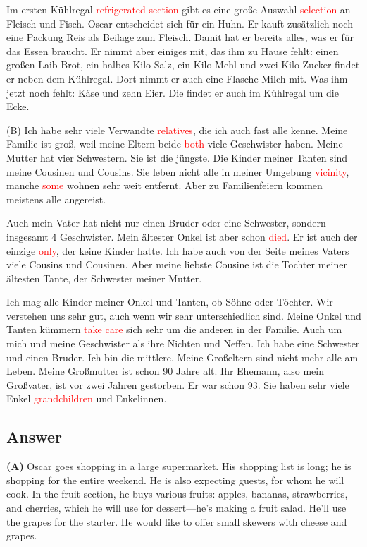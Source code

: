 \documentclass[a4paper,12pt]{article}
\begin{document}
Im ersten Kühlregal \textcolor{red}{refrigerated section} gibt es eine große Auswahl \textcolor{red}{selection} an Fleisch und Fisch. Oscar entscheidet sich für ein Huhn. Er kauft zusätzlich noch eine Packung Reis als Beilage zum Fleisch. Damit hat er bereits alles, was er für das Essen braucht. Er nimmt aber einiges mit, das ihm zu Hause fehlt: einen großen Laib Brot, ein halbes Kilo Salz, ein Kilo Mehl und zwei Kilo Zucker findet er neben dem Kühlregal. Dort nimmt er auch eine Flasche Milch mit. Was ihm jetzt noch fehlt: Käse und zehn Eier. Die findet er auch im Kühlregal um die Ecke.

(B) Ich habe sehr viele Verwandte \textcolor{red}{relatives}, die ich auch fast alle kenne. Meine Familie ist groß, weil meine Eltern beide \textcolor{red}{both} viele Geschwister haben. Meine Mutter hat vier Schwestern. Sie ist die jüngste. Die Kinder meiner Tanten sind meine Cousinen und Cousins. Sie leben nicht alle in meiner Umgebung \textcolor{red}{vicinity}, manche \textcolor{red}{some} wohnen sehr weit entfernt. Aber zu Familienfeiern kommen meistens alle angereist.

Auch mein Vater hat nicht nur einen Bruder oder eine Schwester, sondern insgesamt 4 Geschwister. Mein ältester Onkel ist aber schon  \textcolor{red}{died}. Er ist auch der einzige \textcolor{red}{only}, der keine Kinder hatte. Ich habe auch von der Seite meines Vaters viele Cousins und Cousinen. Aber meine liebste Cousine ist die Tochter meiner ältesten Tante, der Schwester meiner Mutter.

Ich mag alle Kinder meiner Onkel und Tanten, ob Söhne oder Töchter. Wir verstehen uns sehr gut, auch wenn wir sehr unterschiedlich sind. Meine Onkel und Tanten kümmern \textcolor{red}{take care} sich sehr um die anderen in der Familie. Auch um mich und meine Geschwister als ihre Nichten und Neffen. Ich habe eine Schwester und einen Bruder. Ich bin die mittlere. Meine Großeltern sind nicht mehr alle am Leben. Meine Großmutter ist schon 90 Jahre alt. Ihr Ehemann, also mein Großvater, ist vor zwei Jahren gestorben. Er war schon 93. Sie haben sehr viele Enkel \textcolor{red}{grandchildren} und Enkelinnen.

\subsection*{Answer}

\textbf{(A)} Oscar goes shopping in a large supermarket. His shopping list is long; he is shopping for the entire weekend. He is also expecting guests, for whom he will cook. In the fruit section, he buys various fruits: apples, bananas, strawberries, and cherries, which he will use for dessert—he’s making a fruit salad. He’ll use the grapes for the starter. He would like to offer small skewers with cheese and grapes.
\end{document}
